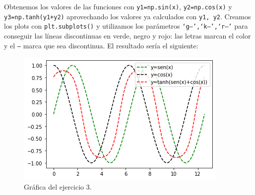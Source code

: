 \documentclass[11pt,a4paper]{report}
\begin{document}
Obtenemos los valores de las funciones con \texttt{y1=np.sin(x)}, \texttt{y2=np.cos(x)} y \texttt{y3=np.tanh(y1+y2)} aprovechando los valores ya calculados con \texttt{y1, y2}. Creamos los plots con \texttt{plt.subplots()} y utilizamos los parámetros \texttt{`g--',`k--',`r--'} para conseguir las líneas discontinuas en verde, negro y rojo: las letras marcan el color y el \texttt{--} marca que sea discontinua. El resultado sería el siguiente:
\begin{figure}[htp]
\centering
\includegraphics[scale=0.90]{imagenes/Ejercicio3.png}
\caption{Gráfica del ejercicio 3.}
\label{t3}
\end{figure}
\end{document}
